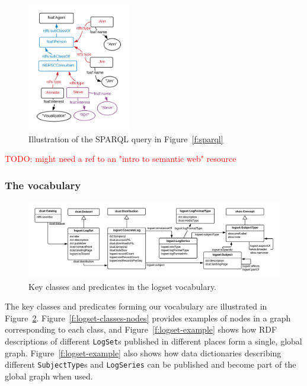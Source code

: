 \begin{figure}
\includegraphics[width=0.4\textwidth]{sparql.png}
\caption{Illustration of the SPARQL query in Figure~\ref{f:sparql} }
\label{f:sparql-diagram}
\end{figure}

\textcolor{red}{TODO: might need a ref to an "intro to semantic web" resource}


\subsubsection{The vocabulary}

\begin{figure}
\includegraphics[width=1.0\textwidth]{logset-key-classes.png}
\caption{Key classes and predicates in the logset vocabulary. }
\label{f:logset-classes}
\end{figure}

The key classes and predicates forming our vocabulary are illustrated in 
Figure~\ref{f:logset-classes}. Figure~\ref{f:logset-classes-nodes} provides 
examples of nodes in a graph corresponding to each class, and 
Figure~\ref{f:logset-example} shows how RDF descriptions of different
\texttt{LogSet}s published in different places form a single, global graph.
Figure~\ref{f:logset-example} also shows how data dictionaries 
describing different \texttt{SubjectType}s and \texttt{LogSeries} can be 
published and become part of the global graph when used.



